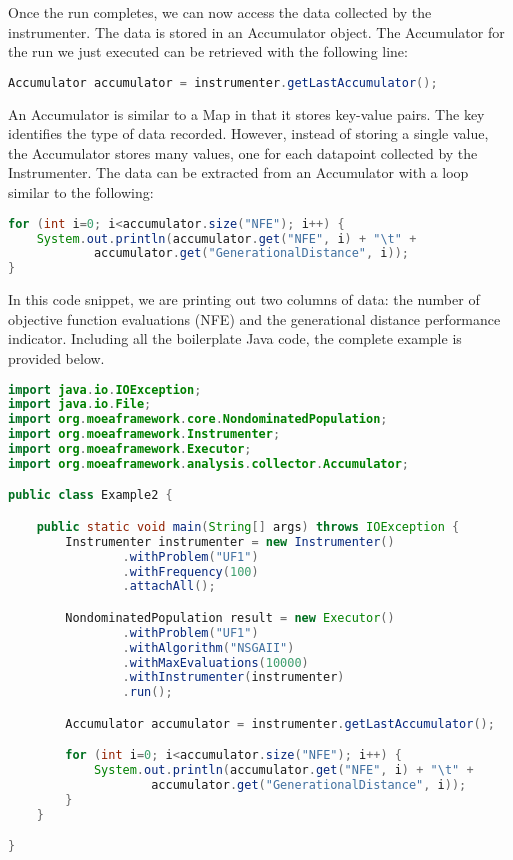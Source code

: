 Once the run completes, we can now access the data collected by the instrumenter.  The data is stored in an Accumulator object.  The Accumulator for the run we just executed can be retrieved with the following line:

\begin{lstlisting}[language=Java]
Accumulator accumulator = instrumenter.getLastAccumulator();
\end{lstlisting}

An Accumulator is similar to a Map in that it stores key-value pairs.  The key identifies the type of data recorded.  However, instead of storing a single value, the Accumulator stores many values, one for each datapoint collected by the Instrumenter.  The data can be extracted from an Accumulator with a loop similar to the following:

\begin{lstlisting}[language=Java]
for (int i=0; i<accumulator.size("NFE"); i++) {
	System.out.println(accumulator.get("NFE", i) + "\t" +  
			accumulator.get("GenerationalDistance", i));
}
\end{lstlisting}

In this code snippet, we are printing out two columns of data: the number of objective function evaluations (NFE) and the generational distance performance indicator.  Including all the boilerplate Java code, the complete example is provided below.

\begin{lstlisting}[language=Java]
import java.io.IOException;
import java.io.File;
import org.moeaframework.core.NondominatedPopulation;
import org.moeaframework.Instrumenter;
import org.moeaframework.Executor;
import org.moeaframework.analysis.collector.Accumulator;

public class Example2 {

	public static void main(String[] args) throws IOException {
		Instrumenter instrumenter = new Instrumenter()
				.withProblem("UF1")
				.withFrequency(100)
				.attachAll();

		NondominatedPopulation result = new Executor()
				.withProblem("UF1")
				.withAlgorithm("NSGAII")
				.withMaxEvaluations(10000)
				.withInstrumenter(instrumenter)
				.run();

		Accumulator accumulator = instrumenter.getLastAccumulator();

		for (int i=0; i<accumulator.size("NFE"); i++) {
			System.out.println(accumulator.get("NFE", i) + "\t" +  
					accumulator.get("GenerationalDistance", i));
		}
	}

}
\end{lstlisting}

